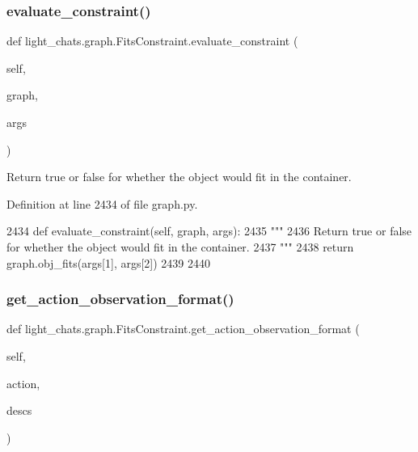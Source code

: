 \subsubsection{\texorpdfstring{evaluate\+\_\+constraint()}{evaluate\_constraint()}}
{\footnotesize\ttfamily def light\+\_\+chats.\+graph.\+Fits\+Constraint.\+evaluate\+\_\+constraint (\begin{DoxyParamCaption}\item[{}]{self,  }\item[{}]{graph,  }\item[{}]{args }\end{DoxyParamCaption})}

\begin{DoxyVerb}Return true or false for whether the object would fit in the container.
\end{DoxyVerb}
 

Definition at line 2434 of file graph.\+py.


\begin{DoxyCode}
2434     \textcolor{keyword}{def }evaluate\_constraint(self, graph, args):
2435         \textcolor{stringliteral}{"""}
2436 \textcolor{stringliteral}{        Return true or false for whether the object would fit in the container.}
2437 \textcolor{stringliteral}{        """}
2438         \textcolor{keywordflow}{return} graph.obj\_fits(args[1], args[2])
2439 
2440 
\end{DoxyCode}
\mbox{\label{classlight__chats_1_1graph_1_1FitsConstraint_a1a14b78e6b28a764e7c7833315db2992}} 
\subsubsection{\texorpdfstring{get\+\_\+action\+\_\+observation\+\_\+format()}{get\_action\_observation\_format()}}
{\footnotesize\ttfamily def light\+\_\+chats.\+graph.\+Fits\+Constraint.\+get\+\_\+action\+\_\+observation\+\_\+format (\begin{DoxyParamCaption}\item[{}]{self,  }\item[{}]{action,  }\item[{}]{descs }\end{DoxyParamCaption})}



